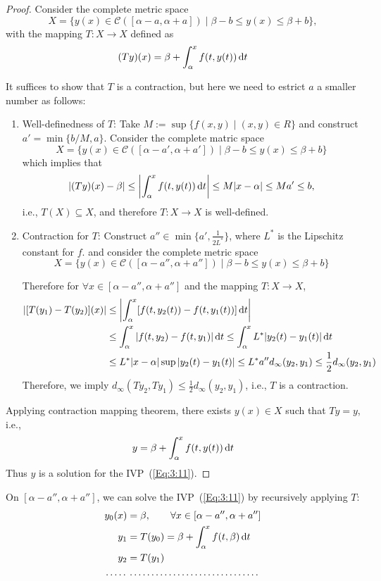 \begin{proof}
Consider the complete metric space
\[
X=\{y(x)\in \mathcal{C}([\alpha-a,\alpha+a])
\mid\beta-b\le y(x)\le\beta+b
\},
\]
with the mapping $T:X\to X$ defined as
\[
(Ty)(x)=\beta
+
\int_\alpha^xf(t,y(t))\,\mathrm{d} t
\]

It suffices to show that $T$ is a contraction, but here we need to estrict $a$ a smaller number as follows:
\begin{enumerate}
\item
Well-definedness of $T$: Take $M:=\sup\{f(x,y)\mid (x,y)\in R\}$ and construct $a'=\min\{b/M,a\}$. Consider the complete matric space 
\[
X=\{y(x)\in \mathcal{C}([\alpha-a',\alpha+a'])
\mid\beta-b\le y(x)\le\beta+b
\}
\]
which implies that 
\[
|(Ty)(x)-\beta|\le 
\left|\int_\alpha^xf(t,y(t))\,\mathrm{d} t\right|
\le M|x-\alpha|\le Ma'\le b,
\]
i.e., $T(X)\subseteq X$, and therefore $T:X\to X$ is well-defined.
\item
Contraction for $T$: Construct $a''\in\min\{a',\frac{1}{2L^*}\}$, where $L^*$ is the Lipschitz constant for $f$. and consider the complete metric space
\[
X=\{y(x)\in \mathcal{C}([\alpha-a'',\alpha+a''])
\mid\beta-b\le y(x)\le\beta+b
\}
\]

Therefore for $\forall x\in[\alpha-a'',\alpha+a'']$ and the mapping $T:X\to X$,
\begin{align*}
|[T(y_1)-T(y_2)](x)|&\le
\left|
\int_\alpha^x[f(t,y_2(t))-f(t,y_1(t))]\,\mathrm{d} t
\right|\\
&\le\int_\alpha^x|f(t,y_2)-f(t,y_1)|\,\mathrm{d} t\le\int_\alpha^xL^*|y_2(t)-y_1(t)|\,\mathrm{d} t\\
&\le L^*|x-\alpha|\sup|y_2(t)-y_1(t)|\le L^*a''d_\infty(y_2,y_1)
\le\frac{1}{2}d_\infty(y_2,y_1)
\end{align*}
Therefore, we imply $d_\infty(Ty_2,Ty_1)\le\frac{1}{2}d_\infty(y_2,y_1)$, i.e., $T$ is a contraction.
\end{enumerate}
Applying contraction mapping theorem, there exists $y(x)\in X$ such that $Ty=y$, i.e.,
\[
y=\beta+\int_\alpha^xf(t,y(t))\,\mathrm{d} t
\]
Thus $y$ is a solution for the IVP~(\ref{Eq:3:11}).
\end{proof}
\begin{remark}
On $[\alpha-a'',\alpha+a'']$, we can solve the IVP~(\ref{Eq:3:11}) by recursively applying $T$:
\begin{align*}
y_0(x)&=\beta,\qquad
\forall x\in[\alpha-a'',\alpha+a'']\\
y_1&=T(y_0)=\beta+\int_\alpha^xf(t,\beta)\diff t\\
y_2&=T(y_1)\\
\multispan1\dotfill&\multispan1\dotfill\\
\end{align*}
\end{remark}

